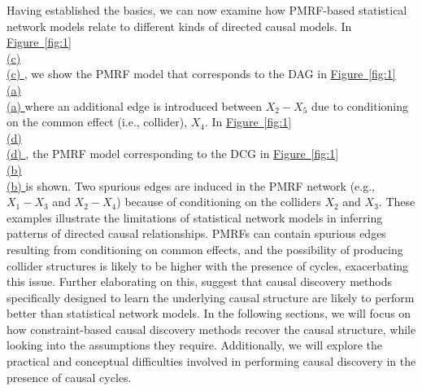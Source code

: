 \documentclass[twoside, 11pt]{article}
\newcommand*{\figref}[2][]{%
  \hyperref[{fig:#2}]{%
    Figure~\ref*{fig:#2}%
    \ifx\\#1\\%
    \else
      #1%
    \fi
  }%
}
\begin{document}
Having established the basics, we can now examine how PMRF-based statistical network models relate to different kinds of directed causal models. In \figref[(c)]{1}, we show the PMRF model that corresponds to the DAG in \figref[(a)]{1} where an additional edge is introduced between $X_2 - X_5$ due to conditioning on the common effect (i.e., collider), $X_4$. In \figref[(d)]{1}, the PMRF model corresponding to the DCG in \figref[(b)]{1} is shown. Two spurious edges are induced in the PMRF network (e.g., $X_1 - X_3$ and $X_2 - X_4$) because of conditioning on the colliders $X_2$ and $X_3$. These examples illustrate the limitations of statistical network models in inferring patterns of directed causal relationships. PMRFs can contain spurious edges resulting from conditioning on common effects, and the possibility of producing collider structures is likely to be higher with the presence of cycles, exacerbating this issue. 
Further elaborating on this, \cite{Ryan2022} suggest that causal discovery methods specifically designed to learn the underlying causal structure are likely to perform better than statistical network models. In the following sections, we will focus on how constraint-based causal discovery methods recover the causal structure, while looking into the assumptions they require. Additionally, we will explore the practical and conceptual difficulties involved in performing causal discovery in the presence of causal cycles.
\end{document}
